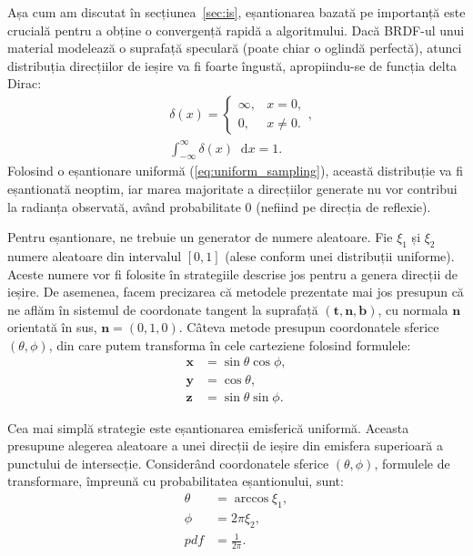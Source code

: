 \documentclass[12pt,a4paper]{report}
\newcommand*\diff{\mathop{}\!\mathrm{d}}
\numberwithin{equation}{section} %
\begin{document}
Așa cum am discutat în
secțiunea~\ref{sec:is}, eșantionarea bazată pe importanță este crucială pentru
a obține o convergență rapidă a algoritmului. Dacă BRDF-ul unui material modelează
o suprafață speculară (poate chiar o oglindă perfectă), atunci distribuția
direcțiilor de ieșire va fi foarte îngustă, apropiindu-se de funcția delta Dirac:
\begin{equation}
	\begin{aligned}
		 & \delta(x) = \begin{cases}
			               \infty, & x = 0,    \\
			               0,      & x \neq 0.
		               \end{cases},                \\
		 & \int_{-\infty}^{\infty} \delta(x) \diff x = 1.
	\end{aligned}
\end{equation}
Folosind o eșantionare uniformă (\ref{eq:uniform_sampling}), această distribuție va fi eșantionată neoptim,
iar marea majoritate a direcțiilor generate nu vor contribui la radianța observată,
având probabilitate 0 (nefiind pe direcția de reflexie).

Pentru eșantionare, ne trebuie un generator de numere aleatoare. Fie $\xi_1$ și $\xi_2$
numere aleatoare din intervalul $[0, 1]$ (alese conform unei distribuții uniforme).
Aceste numere vor fi folosite în strategiile descrise jos pentru a genera direcții
de ieșire. De asemenea, facem precizarea că metodele prezentate mai jos presupun
că ne aflăm în sistemul de coordonate tangent la suprafață $(\mathbf{t}, \mathbf{n}, \mathbf{b})$, cu normala $\mathbf{n}$
orientată în sus, $\mathbf{n} = (0, 1, 0)$. Câteva metode presupun coordonatele sferice $(\theta, \phi)$,
din care putem transforma în cele carteziene folosind formulele:
\begin{equation}
	\begin{aligned}
		\mathbf{x} & = \sin \theta \cos \phi, \\
		\mathbf{y} & = \cos \theta,           \\
		\mathbf{z} & = \sin \theta \sin \phi.
	\end{aligned}
\end{equation}

Cea mai simplă strategie este eșantionarea emisferică uniformă. Aceasta presupune
alegerea aleatoare a unei direcții de ieșire din emisfera superioară a punctului
de intersecție. Considerând coordonatele sferice $(\theta, \phi)$, formulele
de transformare, împreună cu probabilitatea eșantionului, sunt:
\begin{equation}\label{eq:uniform_sampling}
	\begin{aligned}
		\theta & = \arccos \xi_1,  \\
		\phi   & = 2\pi \xi_2,     \\
		pdf    & = \frac{1}{2\pi}.
	\end{aligned}
\end{equation}
\end{document}
